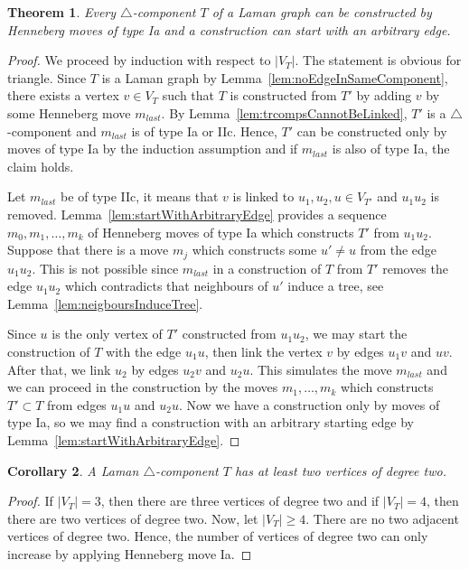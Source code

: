 \documentclass[a4paper, 11pt]{article}
\newcommand{\trcomp}{$\triangle$-component}
\newtheorem{thm}{Theorem}[section]
\newtheorem{cor}[thm]{Corollary}
\theoremstyle{definition}
\begin{document}
\begin{thm}
\label{thm:everyTrcompByIa}
Every \trcomp{} $T$ of a Laman graph can be constructed by Henneberg moves of type Ia and a construction can start with an arbitrary edge.
\end{thm}
\begin{proof}
We proceed by induction with respect to $|V_T|$. The statement is obvious for triangle. Since $T$ is a Laman graph by Lemma~\ref{lem:noEdgeInSameComponent}, there exists a vertex $v\in V_T$ such that $T$ is constructed from $T'$ by adding $v$ by some Henneberg move $m_{last}$. By Lemma~\ref{lem:trcompsCannotBeLinked}, $T'$ is a \trcomp{} and $m_{last}$ is of type Ia or IIc. Hence, $T'$ can be constructed only by moves of type Ia by the induction assumption and if  $m_{last}$ is also of type Ia, the claim holds. 

Let $m_{last}$ be of type IIc, it means that $v$ is linked to $u_1, u_2, u\in V_{T'}$ and  $u_1u_2$ is removed. Lemma~\ref{lem:startWithArbitraryEdge} provides a sequence $m_0, m_1, \dots, m_k$ of Henneberg moves of type Ia which constructs $T'$ from $u_1u_2$. Suppose that there is a move $m_j$ which constructs some $u'\neq u$  from the edge $u_1u_2$. This is not possible since $m_{last}$ in a construction of $T$ from $T'$ removes the edge $u_1u_2$ which contradicts that neighbours of $u'$ induce a tree, see Lemma~\ref{lem:neigboursInduceTree}.

Since $u$ is the only vertex of $T'$ constructed from $u_1u_2$, we may start the construction of $T$ with the edge $u_1u$, then link the vertex $v$ by edges $u_1v$ and $uv$. After that, we link $u_2$ by edges $u_2v$ and $u_2u$. This simulates the move $m_{last}$ and we can proceed in the construction by the moves $m_1, \dots, m_k$ which constructs $T'\subset T$ from edges $u_1u$ and $u_2u$. Now we have a construction only by moves of type Ia, so we may find a construction with an arbitrary starting edge by Lemma~\ref{lem:startWithArbitraryEdge}.
\end{proof}

\begin{cor}
\label{cor:atLeastTwoDegTwoInTrComp}
A Laman \trcomp{} $T$ has at least two vertices of degree two.
\end{cor}
\begin{proof}
If $|V_T|=3$, then there are three vertices of degree two and if $|V_T|=4$, then there are two vertices of degree two. Now, let $|V_T|\geq4$. There are no two adjacent vertices of degree two. Hence, the number of vertices of degree two can only increase by applying Henneberg move Ia.
\end{proof}
\end{document}
